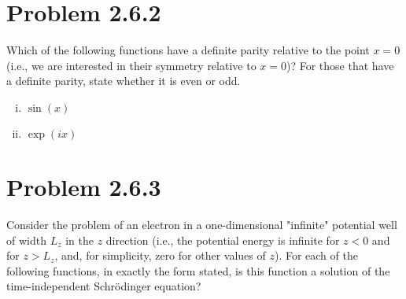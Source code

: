 \section*{Problem 2.6.2}

Which of the following functions have a definite parity relative to
the point $x = 0$ (i.e., we are
interested in their symmetry relative to $x = 0$)? For those that
have a definite parity, state whether it
is even or odd.

\begin{enumerate}[(i)]
  \item $\sin(x)$


  \item $\exp(ix)$


\end{enumerate}

\pagebreak

\section*{Problem 2.6.3}

Consider the problem of an electron in a one-dimensional "infinite"
potential well of width $L_z$ in
the $z$ direction (i.e., the potential energy is infinite for $z < 0$ and
  for $z > L_z$, and, for simplicity, zero
for other values of $z$). For each of the following functions, in
exactly the form stated, is this function
a solution of the time-independent Schr\"odinger equation?

